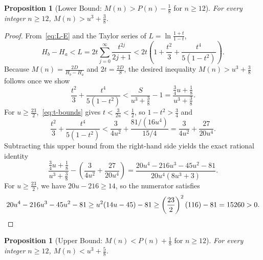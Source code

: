 \documentclass[11pt,a4paper]{article}
\newtheorem{proposition}[theorem]{Proposition}
\theoremstyle{remark}
\begin{document}
\begin{proposition}[Lower Bound: $M(n) > P(n) - \frac{1}{8}$ for $n \ge 12$]\label{prop:lower}
For every integer $n \ge 12$, $M(n) > u^3 + \frac{3}{8}$.
\end{proposition}

\begin{proof}
From~\eqref{eq:L-E} and the Taylor series of $L = \ln\frac{1+t}{1-t}$,
\[
  H_b - H_a < L = 2t \sum_{j=0}^{\infty} \frac{t^{2j}}{2j+1} < 2t\!\left(1 + \frac{t^2}{3} + \frac{t^4}{5(1 - t^2)}\right).
\]
Because $M(n) = \frac{2D}{H_b - H_a}$ and $2t = \frac{2D}{S}$, the desired inequality $M(n) > u^3 + \frac{3}{8}$ follows once we show
\[
  \frac{t^2}{3} + \frac{t^4}{5(1 - t^2)} < \frac{S}{u^3 + \frac{3}{8}} - 1 = \frac{\frac{3}{4}u + \frac{1}{8}}{u^3 + \frac{3}{8}}.
\]
For $u \ge \frac{23}{2}$,~\eqref{eq:t-bounds} gives $t < \frac{3}{2u} < \frac{1}{2}$, so $1 - t^2 > \frac{3}{4}$ and
\[
  \frac{t^2}{3} + \frac{t^4}{5(1 - t^2)} < \frac{3}{4u^2} + \frac{81/(16u^4)}{15/4} = \frac{3}{4u^2} + \frac{27}{20u^4}.
\]
Subtracting this upper bound from the right-hand side yields the exact rational identity
\[
  \frac{\frac{3}{4}u + \frac{1}{8}}{u^3 + \frac{3}{8}} - \left(\frac{3}{4u^2} + \frac{27}{20u^4}\right) = \frac{20u^4 - 216u^3 - 45u^2 - 81}{20u^4(8u^3 + 3)}.
\]
For $u \ge \frac{23}{2}$, we have $20u - 216 \ge 14$, so the numerator satisfies
\[
  20u^4 - 216u^3 - 45u^2 - 81 \ge u^2(14u - 45) - 81 \ge \left(\frac{23}{2}\right)^2 (116) - 81 = 15260 > 0. \qedhere
\]
\end{proof}

\begin{proposition}[Upper Bound: $M(n) < P(n) + \frac{1}{8}$ for $n \ge 12$]\label{prop:upper}
For every integer $n \ge 12$, $M(n) < u^3 + \frac{5}{8}$.
\end{proposition}
\end{document}
